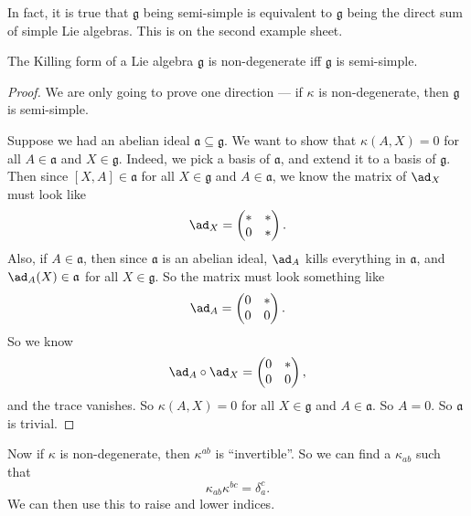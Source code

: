 \documentclass[a4paper]{article}
\begin{document}
In fact, it is true that $\mathfrak{g}$ being semi-simple is equivalent to $\mathfrak{g}$ being the direct sum of simple Lie algebras. This is on the second example sheet.
\begin{thm}[Cartan]
  The Killing form of a Lie algebra $\mathfrak{g}$ is non-degenerate iff $\mathfrak{g}$ is semi-simple.
\end{thm}

\begin{proof}
  We are only going to prove one direction --- if $\kappa$ is non-degenerate, then $\mathfrak{g}$ is semi-simple.

  Suppose we had an abelian ideal $\mathfrak{a} \subseteq \mathfrak{g}$. We want to show that $\kappa(A, X) = 0$ for all $A \in \mathfrak{a}$ and $X \in \mathfrak{g}$. Indeed, we pick a basis of $\mathfrak{a}$, and extend it to a basis of $\mathfrak{g}$. Then since $[X, A] \in \mathfrak{a}$ for all $X \in \mathfrak{g}$ and $A \in \mathfrak{a}$, we know the matrix of $\ad_X$ must look like
  \[
    \ad_X =
    \begin{pmatrix}
      * & *\\
      0 & *
    \end{pmatrix}.
  \]
  Also, if $A \in \mathfrak{a}$, then since $\mathfrak{a}$ is an abelian ideal, $\ad_A$ kills everything in $\mathfrak{a}$, and $\ad_A(X) \in \mathfrak{a}$ for all $X \in \mathfrak{g}$. So the matrix must look something like
  \[
    \ad_A =
    \begin{pmatrix}
      0 & *\\
      0 & 0
    \end{pmatrix}.
  \]
  So we know
  \[
    \ad_A \circ \ad_X =
    \begin{pmatrix}
      0 & *\\
      0 & 0
    \end{pmatrix},
  \]
  and the trace vanishes. So $\kappa(A, X) = 0$ for all $X \in \mathfrak{g}$ and $A \in \mathfrak{a}$. So $A = 0$. So $\mathfrak{a}$ is trivial.
\end{proof}
Now if $\kappa$ is non-degenerate, then $\kappa^{ab}$ is ``invertible''. So we can find a $\kappa_{ab}$ such that
\[
  \kappa_{ab}\kappa^{bc} = \delta_a^c.
\]
We can then use this to raise and lower indices.
\end{document}
